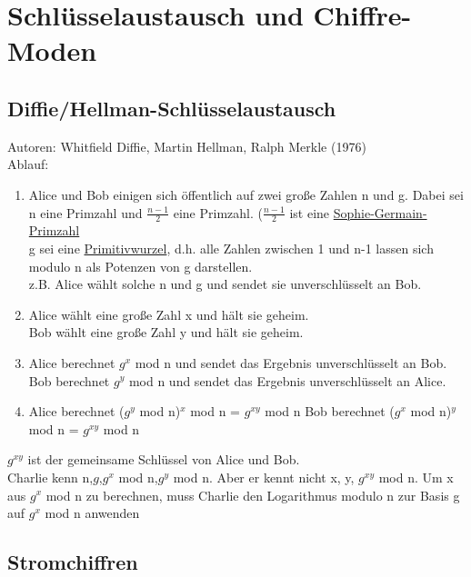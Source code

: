 \documentclass[a4paper,12pt]{article}
\begin{document}
\section{Schlüsselaustausch und Chiffre-Moden}
\subsection{Diffie/Hellman-Schlüsselaustausch}
Autoren: Whitfield Diffie, Martin Hellman, Ralph Merkle (1976)\\
Ablauf:
\begin{enumerate}
 \item Alice und Bob einigen sich öffentlich auf zwei große Zahlen n und g. Dabei sei n eine Primzahl und $\frac{n-1}{2}$ eine Primzahl. ($\frac{n-1}{2}$ ist eine \underline{Sophie-Germain-Primzahl}\\
 g sei eine \underline{Primitivwurzel}, d.h. alle Zahlen zwischen 1 und n-1 lassen sich modulo n als Potenzen von g darstellen.\\
 z.B. Alice wählt solche n und g und sendet sie unverschlüsselt an Bob.
 \item Alice wählt eine große Zahl x und hält sie geheim.\\
	Bob wählt eine große Zahl y und hält sie geheim.
 \item Alice berechnet $g^x$ mod n und sendet das Ergebnis unverschlüsselt an Bob.
 Bob berechnet $g^y$ mod n und sendet das Ergebnis unverschlüsselt an Alice.
 \item Alice berechnet ($g^y$ mod n)$^x$ mod n = $g^{xy}$ mod n
 Bob berechnet ($g^x$ mod n)$^y$ mod n = $g^{xy}$ mod n
\end{enumerate}

$g^{xy}$ ist der gemeinsame Schlüssel von Alice und Bob.\\
Charlie kenn n,$g$,$g^x$ mod n,$g^y$ mod n. Aber er kennt nicht x, y, $g^{xy}$ mod n. Um x aus $g^x$ mod n zu berechnen, muss Charlie den Logarithmus modulo n zur Basis g auf $g^x$ mod n anwenden

\subsection{Stromchiffren}
\end{document}
